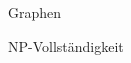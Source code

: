 \documentclass{article}
\begin{document}
\begin{exercise}{Graphen}
  


  \begin{solution}

  \end{solution}
\end{exercise}

\begin{exercise}{NP-Vollständigkeit}



  \begin{solution}

  \end{solution}
\end{exercise}
\end{document}

